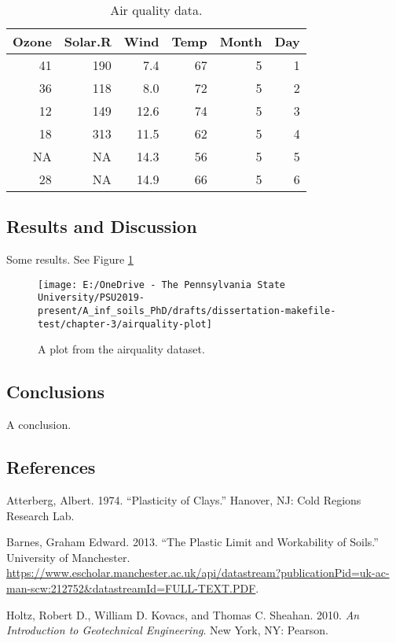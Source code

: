 \documentclass[
]{article}
\newlength{\cslhangindent}
\newlength{\cslentryspacingunit} %
\newenvironment{CSLReferences}[2] %
 {%
  \setlength{\parindent}{0pt}
  \ifodd #1
  \let\oldpar\par
  \def\par{\hangindent=\cslhangindent\oldpar}
  \fi
  \setlength{\parskip}{#2\cslentryspacingunit}
 }%
 {}
\begin{document}
\begin{table}

\caption{\label{tab:ch-3-table}Air quality data.}
\centering
\begin{tabular}[t]{r|r|r|r|r|r}
\hline
Ozone & Solar.R & Wind & Temp & Month & Day\\
\hline
41 & 190 & 7.4 & 67 & 5 & 1\\
\hline
36 & 118 & 8.0 & 72 & 5 & 2\\
\hline
12 & 149 & 12.6 & 74 & 5 & 3\\
\hline
18 & 313 & 11.5 & 62 & 5 & 4\\
\hline
NA & NA & 14.3 & 56 & 5 & 5\\
\hline
28 & NA & 14.9 & 66 & 5 & 6\\
\hline
\end{tabular}
\end{table}

\hypertarget{results-and-discussion-2}{%
\subsection{Results and Discussion}\label{results-and-discussion-2}}

Some results. See Figure \ref{fig:airquality-plot}

\begin{figure}
\texttt{[image: E:/OneDrive - The Pennsylvania State University/PSU2019-present/A\_inf\_soils\_PhD/drafts/dissertation-makefile-test/chapter-3/airquality-plot]} \caption{A plot from the airquality dataset.}\label{fig:airquality-plot}
\end{figure}

\hypertarget{conclusions-2}{%
\subsection{Conclusions}\label{conclusions-2}}

A conclusion.

\hypertarget{references-2}{%
\subsection*{References}\label{references-2}}

\hypertarget{refs}{}
\begin{CSLReferences}{1}{0}
\leavevmode{}%
Atterberg, Albert. 1974. {``Plasticity of Clays.''} {Hanover, NJ}: {Cold Regions Research Lab}.

\leavevmode{}%
Barnes, Graham Edward. 2013. {``The {Plastic Limit} and {Workability} of {Soils}.''} {University of Manchester}. \url{https://www.escholar.manchester.ac.uk/api/datastream?publicationPid=uk-ac-man-scw:212752\&datastreamId=FULL-TEXT.PDF}.

\leavevmode{}%
Holtz, Robert D., William D. Kovacs, and Thomas C. Sheahan. 2010. \emph{An {Introduction} to {Geotechnical Engineering}}. {New York, NY}: {Pearson}.

\end{CSLReferences}
\end{document}
